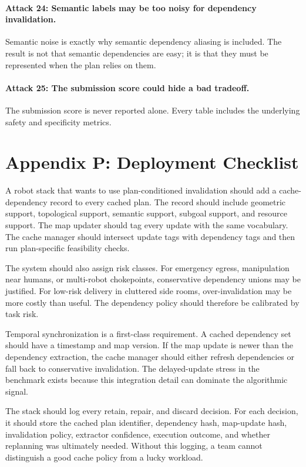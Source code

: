 \documentclass{article}
\begin{document}
\paragraph{Attack 24: Semantic labels may be too noisy for dependency invalidation.}
Semantic noise is exactly why semantic dependency aliasing is included. The result is not that semantic dependencies are easy; it is that they must be represented when the plan relies on them.

\paragraph{Attack 25: The submission score could hide a bad tradeoff.}
The submission score is never reported alone. Every table includes the underlying safety and specificity metrics.

\section{Appendix P: Deployment Checklist}

A robot stack that wants to use plan-conditioned invalidation should add a cache-dependency record to every cached plan. The record should include geometric support, topological support, semantic support, subgoal support, and resource support. The map updater should tag every update with the same vocabulary. The cache manager should intersect update tags with dependency tags and then run plan-specific feasibility checks.

The system should also assign risk classes. For emergency egress, manipulation near humans, or multi-robot chokepoints, conservative dependency unions may be justified. For low-risk delivery in cluttered side rooms, over-invalidation may be more costly than useful. The dependency policy should therefore be calibrated by task risk.

Temporal synchronization is a first-class requirement. A cached dependency set should have a timestamp and map version. If the map update is newer than the dependency extraction, the cache manager should either refresh dependencies or fall back to conservative invalidation. The delayed-update stress in the benchmark exists because this integration detail can dominate the algorithmic signal.

The stack should log every retain, repair, and discard decision. For each decision, it should store the cached plan identifier, dependency hash, map-update hash, invalidation policy, extractor confidence, execution outcome, and whether replanning was ultimately needed. Without this logging, a team cannot distinguish a good cache policy from a lucky workload.
\end{document}
